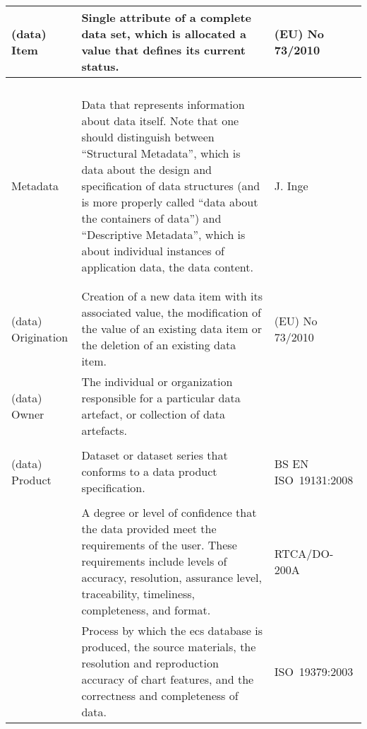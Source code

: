 \begin{longtable}{|p{}|L{}|L{}|}
  \hline
  (data) Item & Single attribute of a complete data set, which is allocated a value that defines its current status. & (EU) No 73/2010 \cite{citation:EU732010}\\
  \hline
  \\
  \hline
  \\
  \hline
  \\
  \hline
  \\
  \hline
  Metadata & Data that represents information about data itself. Note that one should distinguish between ``Structural Metadata'', which is data about the design and specification of data structures (and is more properly called ``data about the containers of data'') and ``Descriptive Metadata'', which is about individual instances of application data, the data content. & J. Inge \cite{citation:inge2008improving}\\
  \hline
  \\
  \hline
  \\
  \hline
  (data) Origination & Creation of a new data item with its associated value, the modification of the value of an existing data item or the deletion of an existing data item. & (EU) No 73/2010 \cite{citation:EU732010}\\
  \hline
  (data) Owner & The individual or organization responsible for a particular data artefact, or collection of data artefacts. & \\
  \hline
  \\
  \hline
  (data) Product & Dataset or dataset series that conforms to a data product specification. & BS EN ISO\ 19131:2008 \cite{citation:ISO19131}\\
  \hline
  \\
  \hline
  & A degree or level of confidence that the data provided meet the requirements of the user. These requirements include levels of \gls{accuracy}, resolution, assurance level, traceability, timeliness, completeness, and format. & RTCA/DO-200A \cite{citation:ED76}\\
  & Process by which the \gls{ecs} database is produced, the source materials, the resolution and reproduction \gls{accuracy} of chart features, and the correctness and completeness of data. & ISO\ 19379:2003 \cite{citation:ISO19379}\\

\end{longtable}
